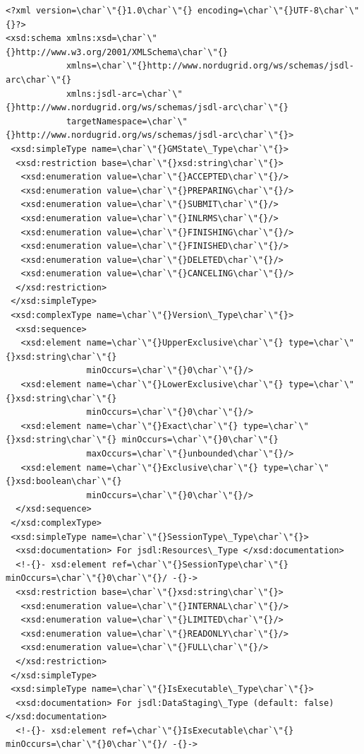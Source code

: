\documentclass{article}                            %
\begin{document}
\begin{footnotesize}\begin{verbatim}
<?xml version=\char`\"{}1.0\char`\"{} encoding=\char`\"{}UTF-8\char`\"{}?>
<xsd:schema xmlns:xsd=\char`\"{}http://www.w3.org/2001/XMLSchema\char`\"{}
            xmlns=\char`\"{}http://www.nordugrid.org/ws/schemas/jsdl-arc\char`\"{}
            xmlns:jsdl-arc=\char`\"{}http://www.nordugrid.org/ws/schemas/jsdl-arc\char`\"{}
            targetNamespace=\char`\"{}http://www.nordugrid.org/ws/schemas/jsdl-arc\char`\"{}>
 <xsd:simpleType name=\char`\"{}GMState\_Type\char`\"{}>
  <xsd:restriction base=\char`\"{}xsd:string\char`\"{}>
   <xsd:enumeration value=\char`\"{}ACCEPTED\char`\"{}/>
   <xsd:enumeration value=\char`\"{}PREPARING\char`\"{}/>
   <xsd:enumeration value=\char`\"{}SUBMIT\char`\"{}/>
   <xsd:enumeration value=\char`\"{}INLRMS\char`\"{}/>
   <xsd:enumeration value=\char`\"{}FINISHING\char`\"{}/>
   <xsd:enumeration value=\char`\"{}FINISHED\char`\"{}/>
   <xsd:enumeration value=\char`\"{}DELETED\char`\"{}/>
   <xsd:enumeration value=\char`\"{}CANCELING\char`\"{}/>
  </xsd:restriction>
 </xsd:simpleType>
 <xsd:complexType name=\char`\"{}Version\_Type\char`\"{}>
  <xsd:sequence>
   <xsd:element name=\char`\"{}UpperExclusive\char`\"{} type=\char`\"{}xsd:string\char`\"{}
                minOccurs=\char`\"{}0\char`\"{}/>
   <xsd:element name=\char`\"{}LowerExclusive\char`\"{} type=\char`\"{}xsd:string\char`\"{}
                minOccurs=\char`\"{}0\char`\"{}/>
   <xsd:element name=\char`\"{}Exact\char`\"{} type=\char`\"{}xsd:string\char`\"{} minOccurs=\char`\"{}0\char`\"{}
                maxOccurs=\char`\"{}unbounded\char`\"{}/>
   <xsd:element name=\char`\"{}Exclusive\char`\"{} type=\char`\"{}xsd:boolean\char`\"{}
                minOccurs=\char`\"{}0\char`\"{}/>
  </xsd:sequence>
 </xsd:complexType>
 <xsd:simpleType name=\char`\"{}SessionType\_Type\char`\"{}>
  <xsd:documentation> For jsdl:Resources\_Type </xsd:documentation>
  <!-{}- xsd:element ref=\char`\"{}SessionType\char`\"{} minOccurs=\char`\"{}0\char`\"{}/ -{}->
  <xsd:restriction base=\char`\"{}xsd:string\char`\"{}>
   <xsd:enumeration value=\char`\"{}INTERNAL\char`\"{}/>
   <xsd:enumeration value=\char`\"{}LIMITED\char`\"{}/>
   <xsd:enumeration value=\char`\"{}READONLY\char`\"{}/>
   <xsd:enumeration value=\char`\"{}FULL\char`\"{}/>
  </xsd:restriction>
 </xsd:simpleType>
 <xsd:simpleType name=\char`\"{}IsExecutable\_Type\char`\"{}>
  <xsd:documentation> For jsdl:DataStaging\_Type (default: false) </xsd:documentation>
  <!-{}- xsd:element ref=\char`\"{}IsExecutable\char`\"{} minOccurs=\char`\"{}0\char`\"{}/ -{}->

\end{verbatim}
\end{footnotesize}
\end{document}
